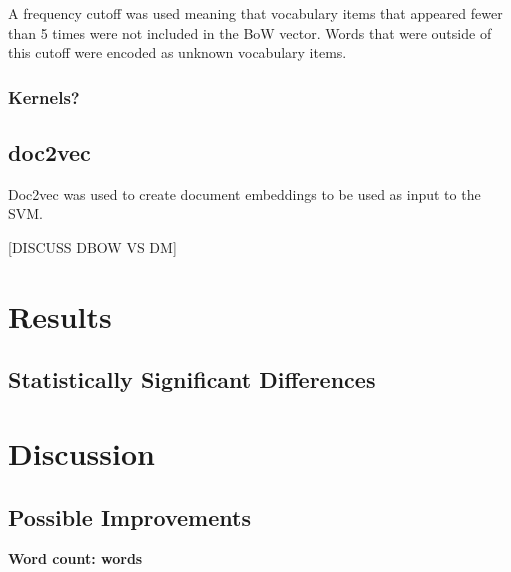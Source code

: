 \documentclass[twocolumn]{article}
\begin{document}
A frequency cutoff was used meaning that vocabulary items that appeared fewer than 5 times were not included in the BoW vector. Words that were outside of this cutoff were encoded as unknown vocabulary items.

\subsubsection{Kernels?}

\subsection{doc2vec}

Doc2vec \cite{doc2vec} was used to create document embeddings to be used as input to the SVM. 

[DISCUSS DBOW VS DM]

\section{Results}



\subsection{Statistically Significant Differences}


\section{Discussion}


\subsection{Possible Improvements}





\textbf{Word count:  words}

{}

\end{document}
